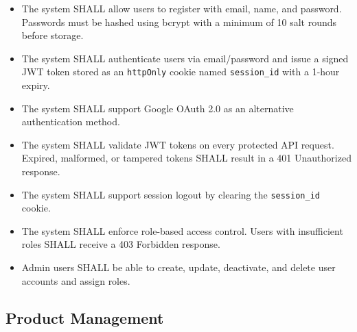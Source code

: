 \documentclass[12pt,a4paper]{report}
\begin{document}
\begin{tcolorbox}[reqbox,title={FR-AUTH: Authentication Requirements}]
\begin{itemize}[leftmargin=1.5em]
  \item {} The system SHALL allow users to register with email, name, and password. Passwords must be hashed using bcrypt with a minimum of 10 salt rounds before storage.
  \item {} The system SHALL authenticate users via email/password and issue a signed JWT token stored as an \texttt{httpOnly} cookie named \texttt{session\_id} with a 1-hour expiry.
  \item {} The system SHALL support Google OAuth 2.0 as an alternative authentication method.
  \item {} The system SHALL validate JWT tokens on every protected API request. Expired, malformed, or tampered tokens SHALL result in a 401 Unauthorized response.
  \item {} The system SHALL support session logout by clearing the \texttt{session\_id} cookie.
  \item {} The system SHALL enforce role-based access control. Users with insufficient roles SHALL receive a 403 Forbidden response.
  \item {} Admin users SHALL be able to create, update, deactivate, and delete user accounts and assign roles.
\end{itemize}
\end{tcolorbox}

\subsection{Product Management}
\end{document}
